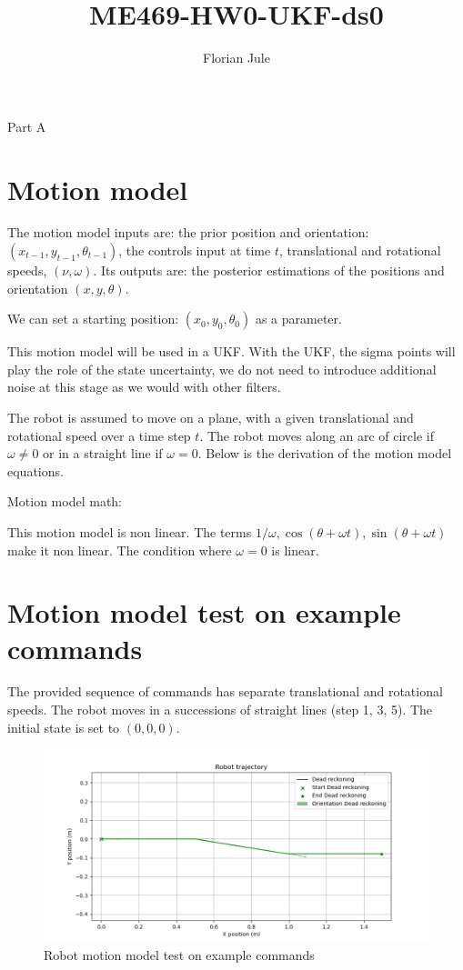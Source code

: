 \documentclass{article}
\title{ME469-HW0-UKF-ds0}
\author{Florian Jule}
\begin{document}
\maketitle

\large{Part A}
\normalsize{}

\section{Motion model}

The motion model inputs are: the prior position and orientation: $(x_{t-1}, y_{t-1}, \theta_{t-1})$, the controls input at time $t$, translational and rotational speeds, $(\nu,\omega)$. 
Its outputs are: the posterior estimations of the positions and orientation $(x, y, \theta)$.

We can set a starting position: $(x_0, y_0, \theta_0)$ as a parameter.

This motion model will be used in a UKF. With the UKF, the sigma points will play the role of the state uncertainty, we do not need to introduce additional noise at this stage as we would with other filters.

The robot is assumed to move on a plane, with a given translational and rotational speed over a time step $t$. The robot moves along an arc of circle if $\omega \neq 0$ or in a straight line if $\omega=0$. Below is the derivation of the motion model equations.


Motion model math:




This motion model is non linear. The terms $1/\omega, \cos(\theta+\omega t), \sin(\theta+\omega t)$ make it non linear. The  condition where $\omega=0$ is linear.

\section{Motion model test on example commands}
The provided sequence of commands has separate translational and rotational speeds. The robot moves in a successions of straight lines (step 1, 3, 5). The initial state is set to $(0,0,0)$.

\begin{figure}
\centering
\includegraphics[scale=0.3]{Figure_1.png}
\caption{Robot motion model test on example commands}
\label{fig:figure1}
\end{figure}
\end{document}
